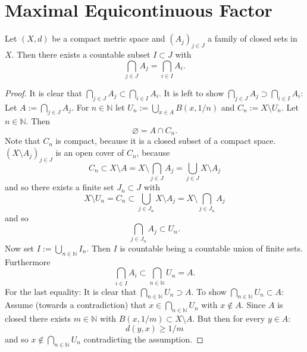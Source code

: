 \section{Maximal Equicontinuous Factor}
\begin{lemma}
  \label{lem:countableSubIntersection}
  Let $(X,d)$ be a compact metric space and $(A_j)_{j \in J}$ a family of closed sets in $X$.
  Then there exists a countable subset $I \subset J$ with
  \begin{equation*}
    \bigcap_{j \in J} A_j = \bigcap_{i \in I} A_{i}.
  \end{equation*}
\end{lemma}
\begin{proof}

  It is clear that $\bigcap_{j \in J} A_j \subset \bigcap_{i \in I} A_{i}$.
  It is left to show $\bigcap_{j \in J} A_j \supset \bigcap_{i \in I} A_{i}$:
Let $A:=\bigcap_{j \in J} A_j$.
  For $n \in \mathbb{N}$ let $U_n := \bigcup_{ x \in A} B(x, 1/n)$ and $C_n := X \setminus U_n$.
  Let $n \in \mathbb{N}$. Then
  \begin{equation*}
    \varnothing =  A \cap C_n.
  \end{equation*}
  Note that $C_n$ is compact, because it is a closed subset of a compact space.
  $(X \setminus A_j)_{j \in J}$ is an open cover of $C_n$,
  because
  \begin{equation*}
    C_n \subset X \setminus A = X \setminus \bigcap_{j \in J} A_j = \bigcup_{j \in J} X \setminus A_j
  \end{equation*}
  and so there exists a finite set $J_n \subset J$ with
  \begin{equation*}
    X \setminus U_n = C_n \subset \bigcup_{j \in J_n} X \setminus A_j = X \setminus \bigcap_{j \in J_n} A_j
  \end{equation*}
  and so
  \begin{equation*}
 \bigcap_{j \in J_n} A_j \subset U_n.
  \end{equation*}
  Now set $I := \bigcup_{n \in \mathbb{N}} I_n$.
  Then $I$ is countable being a countable union of finite sets.
  Furthermore
  \begin{equation*}
    \bigcap_{i \in I} A_i \subset \bigcap_{n \in \mathbb{N}} U_n = A.
  \end{equation*}
  For the last equality: It is clear that $\bigcap_{n \in \mathbb{N}} U_n \supset A$.
  To show $\bigcap_{n \in \mathbb{N}}U_n \subset A$:
  Assume (towards a contradiction) that $x \in \bigcap_{n \in \mathbb{N}}U_n $ with $x \notin A$.
  Since $A$ is closed there exists $m \in \mathbb{N}$ with $B(x,1/m) \subset X \setminus A$.
  But then for every $y \in A$:
  \begin{equation*}
    d(y,x) \geq 1/m
  \end{equation*}
  and so $x \notin \bigcap_{n \in \mathbb{N}}U_n$ contradicting the assumption.
\end{proof}
